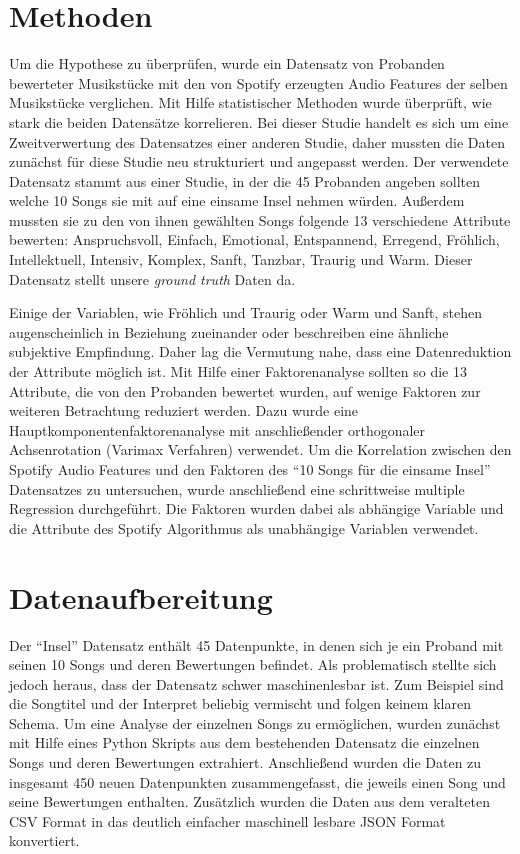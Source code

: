 \section*{Methoden}
\label{sec:Methoden}

Um die Hypothese zu überprüfen,
wurde ein Datensatz von Probanden bewerteter Musikstücke mit den von Spotify erzeugten Audio Features der selben Musikstücke verglichen.
Mit Hilfe statistischer Methoden wurde überprüft, wie stark die beiden Datensätze korrelieren.
Bei dieser Studie handelt es sich um eine Zweitverwertung des Datensatzes einer anderen Studie, daher mussten die Daten zunächst für diese Studie neu strukturiert und angepasst werden.
Der verwendete Datensatz stammt aus einer Studie, in der die 45 Probanden angeben sollten welche 10 Songs sie mit auf eine einsame Insel nehmen würden.
Außerdem mussten sie zu den von ihnen gewählten Songs folgende 13 verschiedene Attribute bewerten: Anspruchsvoll, Einfach, Emotional, Entspannend, Erregend, Fröhlich, Intellektuell, Intensiv, Komplex, Sanft, Tanzbar, Traurig und Warm.
Dieser Datensatz stellt unsere \textit{ground truth} Daten da.

Einige der Variablen, wie Fröhlich und Traurig oder Warm und Sanft, stehen augenscheinlich in Beziehung zueinander oder beschreiben eine ähnliche subjektive Empfindung.
Daher lag die Vermutung nahe, dass eine Datenreduktion der Attribute möglich ist.
Mit Hilfe einer Faktorenanalyse sollten so die 13 Attribute, die von den Probanden bewertet wurden, auf wenige Faktoren zur weiteren Betrachtung reduziert werden.
Dazu wurde eine Hauptkomponentenfaktorenanalyse mit anschließender orthogonaler Achsenrotation (Varimax Verfahren) verwendet.
Um die Korrelation zwischen den Spotify Audio Features und den Faktoren des "`10 Songs für die einsame Insel"' Datensatzes zu untersuchen, wurde anschließend eine schrittweise multiple Regression durchgeführt.
Die Faktoren wurden dabei als abhängige Variable und die Attribute des Spotify Algorithmus als unabhängige Variablen verwendet.



\section*{Datenaufbereitung}
\label{sec:Datenaufbereitung}


Der "`Insel"' Datensatz enthält 45 Datenpunkte, in denen sich je ein Proband mit seinen 10 Songs und deren Bewertungen befindet.
Als problematisch stellte sich jedoch heraus, dass der Datensatz schwer maschinenlesbar ist. 
Zum Beispiel sind die Songtitel und der Interpret beliebig vermischt und folgen keinem klaren Schema.
Um eine Analyse der einzelnen Songs zu ermöglichen, wurden zunächst mit Hilfe eines Python Skripts aus dem bestehenden Datensatz die einzelnen Songs und deren Bewertungen extrahiert.
Anschließend wurden die Daten zu insgesamt 450 neuen Datenpunkten zusammengefasst, die jeweils einen Song und seine Bewertungen enthalten.
Zusätzlich wurden die Daten aus dem veralteten CSV Format in das deutlich einfacher maschinell lesbare JSON Format konvertiert.

